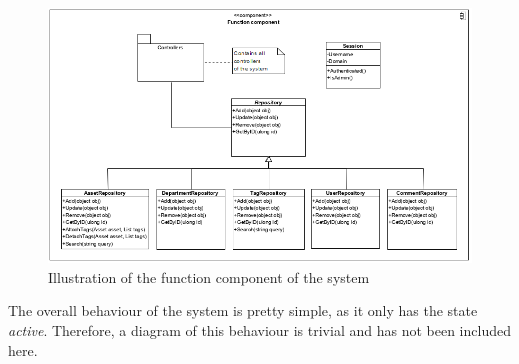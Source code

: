 \begin{figure}[H]
    \centering
    \includegraphics[width=\textwidth]{figures/FunctionComponent/FunctionComponent.png}
    \caption{Illustration of the function component of the system}
    \label{fig:FunctionComponent}
\end{figure}

The overall behaviour of the system is pretty simple, as it only has the state \textit{active}. Therefore, a diagram of this behaviour is trivial and has not been included here.
\newpage